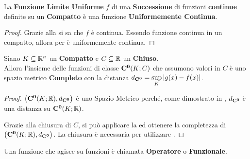 \begin{corollary}
	La \textbf{Funzione Limite Uniforme} $f$ di una \textbf{Successione} di funzioni \textbf{continue} definite su un \textbf{Compatto} è una funzione \textbf{Uniformemente Continua}.
	\begin{proof}
		Grazie alla  si sa che $f$ è continua. Essendo funzione continua in un compatto, allora per  è uniformemente continua.
	\end{proof}
\end{corollary}
\begin{corollary}
	\label{prop:compl_dist_spm_compl}
	Siano $K \subseteq \mathbb{R}^n$ un \textbf{Compatto} e $C \subseteq \mathbb{R}$ un \textbf{Chiuso}.\\
	Allora l'insieme delle funzioni di classe $\mathbf{C^{0}}(K; C)$ che assumono valori in $C$ è uno spazio metrico \textbf{Completo} con la distanza $d_{\mathbf{C^{0}}} = \sup\limits_{K} \left|g(x) - f(x)\right|$.
	\begin{proof}
		$\bigl( \mathbf{C^{0}}(K; \mathbb{R}), d_{\mathbf{C^{0}}} \bigr)$ è uno Spazio Metrico perché, come dimostrato in \hyperref[ex:dim_dist_conv_unif]{}, $d_{\mathbf{C^{0}}}$ è una distanza su $\mathbf{C^{0}}(K; \mathbb{R})$.

		Grazie alla chiusura di $C$, si può applicare la  ed ottenere la completezza di $\bigl( \mathbf{C^{0}}(K; \mathbb{R}), d_{\mathbf{C^{0}}} \bigr)$. La chiusura è necessaria per utilizzare .
	\end{proof}
\end{corollary}

\begin{definition}[Operatore]
	Una funzione che agisce su funzioni è chiamata \textbf{Operatore} o \textbf{Funzionale}.
\end{definition}


